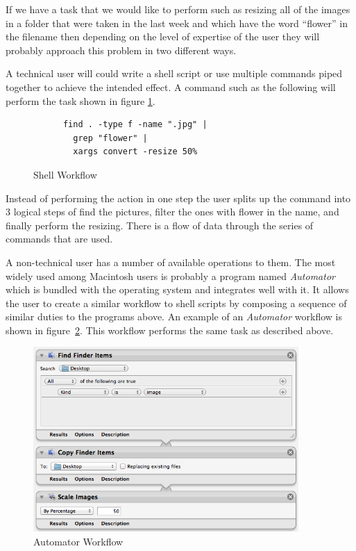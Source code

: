 If we have a task that we would like to perform such as resizing all of the
images in a folder that were taken in the last week and which have the word
``flower'' in the filename then depending on the level of expertise of the user
they will probably approach this problem in two different ways.

A technical user will could write a shell script or use multiple commands
piped together to achieve the intended effect. A command such as the following
will perform the task shown in figure \ref{fig:shell}.

\begin{figure}[ht!]
  \centering
	\begin{verbatim}
	  find . -type f -name ".jpg" |
	    grep "flower" |
	    xargs convert -resize 50%
	\end{verbatim}
  \caption{Shell Workflow}
  \label{fig:shell}
\end{figure}

Instead of performing the action in one step the user splits up the command
into 3 logical steps of find the pictures, filter the ones with flower in the
name, and finally perform the resizing. There is a flow of data through the
series of commands that are used.

A non-technical user has a number of available operations to them. The most
widely used among Macintosh users is probably a program named \emph{Automator}
which is bundled with the operating system and integrates well with it. It
allows the user to create a similar workflow to shell scripts by composing
a sequence of similar duties to the programs above. An example of an
\emph{Automator} workflow is shown in figure~\ref{fig:automator}. This workflow
performs the same task as described above.

\begin{figure}[ht!]
  \centering
  \includegraphics[width=0.9\textwidth]{images/automator}
  \caption{Automator Workflow}
  \label{fig:automator}
\end{figure}

